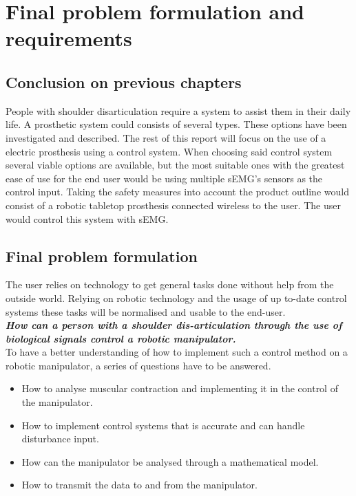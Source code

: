\chapter{Final problem formulation and requirements}
\section{Conclusion on previous chapters}
People with shoulder disarticulation require a system to assist them in their daily life. A prosthetic system could consists of several types. These options have been investigated and described. The rest of this report will focus on the use of a electric prosthesis using a control system. When choosing said control system several viable options are available, but the most suitable ones with the greatest ease of use for the end user would be using multiple sEMG's sensors as the control input. 
Taking the safety measures into account the product outline would consist of a robotic tabletop prosthesis connected wireless to the user. The user would control this system with sEMG. 
\\
\section{Final problem formulation}
The user relies on technology to get general tasks done without help from the outside world.
Relying on robotic technology and the usage of up to-date control systems these tasks will be normalised and usable to the end-user.\\
\noindent
\textbf{\textit{\centering How can a person with a shoulder dis-articulation through the use of biological signals control a robotic manipulator.}}\\

To have a better understanding of how to implement such a control method on a robotic manipulator, a series of questions have to be answered. 
\begin{itemize}
    \item How to analyse muscular contraction and implementing it in the control of the manipulator.
    \item How to implement control systems that is accurate and can handle disturbance input.
    \item How can the manipulator be analysed through a mathematical model.
    \item How to transmit the data to and from the manipulator.
\end{itemize}


